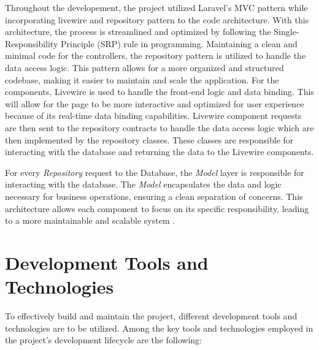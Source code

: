     Throughout the developement, the project utilized Laravel's MVC pattern while incorporating livewire and repository pattern to the code architecture. With this architecture, the process is streamlined and optimized by following the Single-Responsibility Principle (SRP) rule in programming.  Maintaining a clean and minimal code for the controllers, the repository pattern is utilized to handle the data access logic. This pattern allows for a more organized and structured codebase, making it easier to maintain and scale the application. For the components, Livewire is used to handle the front-end logic and data binding. This will allow for the page to be more interactive and optimized for user experience because of its real-time data binding capabilities. Livewire component requests are then sent to the repository contracts to handle the data access logic which are then implemented by the repository classes. These classes are responsible for interacting with the database and returning the data to the Livewire components. 
    
    For every \textit{Repository} request to the Database, the \textit{Model} layer is responsible for interacting with the database. The \textit{Model} encapsulates the data and logic necessary for business operations, ensuring a clean separation of concerns. This architecture allows each component to focus on its specific responsibility, leading to a more maintainable and scalable system \cite{mdn12023} \cite{wikipedia12024}. 

\section{Development Tools and Technologies}

    To effectively build and maintain the project, different development tools and technologies are to be utilized. Among the key tools and technologies employed in the project's development lifecycle are the following:


